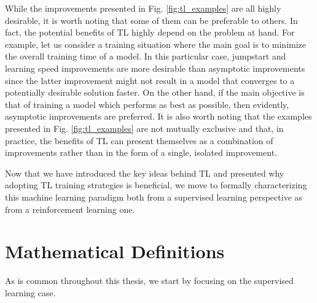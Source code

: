 While the improvements presented in Fig. \ref{fig:tl_examples} are all highly desirable, it is worth noting that some of them can be preferable to others. In fact, the potential benefits of TL highly depend on the problem at hand. For example, let us consider a training situation where the main goal is to minimize the overall training time of a model. In this particular case, jumpstart and learning speed improvements are more desirable than asymptotic improvements since the latter improvement might not result in a model that converges to a potentially desirable solution faster. On the other hand, if the main objective is that of training a model which performs as best as possible, then evidently, asymptotic improvements are preferred. It is also worth noting that the examples presented in Fig. \ref{fig:tl_examples} are not mutually exclusive and that, in practice, the benefits of TL can present themselves as a combination of improvements rather than in the form of a single, isolated improvement. 

Now that we have introduced the key ideas behind TL and presented why adopting TL training strategies is beneficial, we move to formally characterizing this machine learning paradigm both from a supervised learning perspective as from a reinforcement learning one.

\section{Mathematical Definitions}
\label{sec:definitions}

As is common throughout this thesis, we start by focusing on the supervised learning case.


